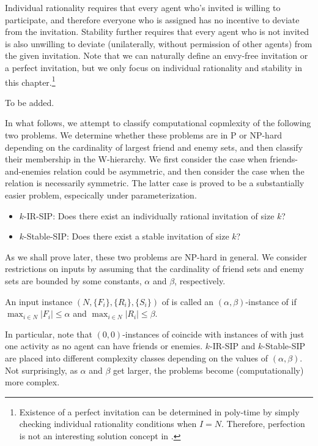 Individual rationality requires that every agent who's invited is willing to participate, and therefore everyone who is assigned has no incentive to deviate from the invitation.
Stability further requires that every agent who is not invited is also unwilling to deviate (unilaterally, without permission of other agents) from the given invitation. 
Note that we can naturally define an envy-free invitation or a perfect invitation, but we only focus on individual rationality and stability in this chapter.\footnote{Existence of a perfect invitation can be determined in poly-time by simply checking individual rationality conditions when $I = N$. Therefore, perfection is not an interesting solution concept in \SIP.}

\begin{example} \label{eg:SIP:notation}
	To be added.
\end{example}

In what follows, we attempt to classify computational copmlexity of the following two problems.
We determine whether these problems are in P or NP-hard depending on the cardinality of largest friend and enemy sets, and then classify their membership in the W-hierarchy.
We first consider the case when friends-and-enemies relation could be asymmetric, and then consider the case when the relation is necessarily symmetric. The latter case is proved to be a substantially easier problem, especically under parameterization.

\begin{itemize}
	\item $k$-IR-SIP: Does there exist an individually rational invitation of size $k$?
	\item $k$-Stable-SIP: Does there exist a stable invitation of size $k$?
\end{itemize}

As we shall prove later, these two problems are NP-hard in general.
We consider restrictions on inputs by assuming that the cardinality of friend sets and enemy sets are bounded by some constants, $\alpha$ and $\beta$, respectively.
\begin{definition}
	An input instance $(N, \{F_i\}, \{R_i\}, \{S_i\})$ of \SIPs is called an $(\alpha,\beta)$-instance of \SIPs if $\max_{i\in N} |F_i| \leq \alpha$ and $\max_{i\in N} |R_i| \leq \beta$. 
\end{definition}
In particular, note that $(0,0)$-instances of \SIPs coincide with instances of \GASPs with just one activity as no agent can have friends or enemies. $k$-IR-SIP and $k$-Stable-SIP are placed into different complexity classes depending on the values of $(\alpha,\beta)$. Not surprisingly, as $\alpha$ and $\beta$ get larger, the problems become (computationally) more complex.


